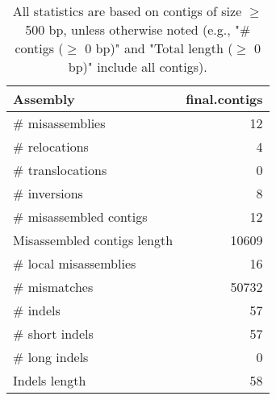 \documentclass[12pt,a4paper]{article}
\begin{document}
\begin{table}[ht]
\begin{center}
\caption{All statistics are based on contigs of size $\geq$ 500 bp, unless otherwise noted (e.g., "\# contigs ($\geq$ 0 bp)" and "Total length ($\geq$ 0 bp)" include all contigs).}
\begin{tabular}{|l*{1}{|r}|}
\hline
Assembly & final.contigs \\ \hline
\# misassemblies & 12 \\ \hline
\hspace{5mm}\# relocations & 4 \\ \hline
\hspace{5mm}\# translocations & 0 \\ \hline
\hspace{5mm}\# inversions & 8 \\ \hline
\# misassembled contigs & 12 \\ \hline
Misassembled contigs length & 10609 \\ \hline
\# local misassemblies & 16 \\ \hline
\# mismatches & 50732 \\ \hline
\# indels & 57 \\ \hline
\hspace{5mm}\# short indels & 57 \\ \hline
\hspace{5mm}\# long indels & 0 \\ \hline
Indels length & 58 \\ \hline
\end{tabular}
\end{center}
\end{table}
\end{document}
